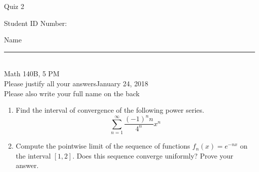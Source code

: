 \documentclass[12pt]{article}
\begin{document}
\begin{flushleft} 
\centerline{\LARGE{Quiz 2}} 
\vspace{5 mm}
{Student ID Number:}\hfill  
{Name \rule {2 in}{0.01in}}\\
Math 140B, 5 PM
\\
{Please justify all your answers}\hfill {January 24, 2018}
\\
{Please also write your full name on the back} 

\medskip
\end{flushleft}
\begin{enumerate}
	\item Find the interval of convergence of the following power series.
	\[
	\sum_{n=1}^\infty \frac{(-1)^nn}{4^n}x^n
	\]
	\vfill

	\item Compute the pointwise limit of the sequence of functions $f_n(x) = e^{-nx}$ on the interval $[1, 2]$. Does this sequence converge uniformly? Prove your answer.
	\vfill
\end{enumerate}


\end{document}
